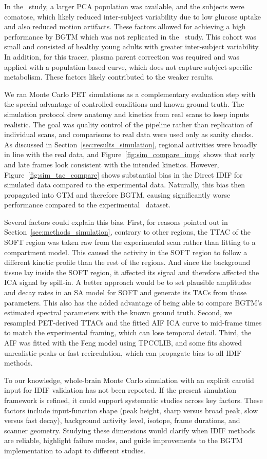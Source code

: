 In the \fdg\ study, a larger PCA population was available, and the subjects were comatose, which likely reduced inter-subject variability due to low glucose uptake and also reduced motion artifacts.
These factors allowed for achieving a high performance by BGTM which was not replicated in the \yohimbine\ study.
This cohort was small and consisted of healthy young adults with greater inter-subject variability.
In addition, for this tracer, plasma parent correction was required and was applied with a population-based curve, which does not capture subject-specific metabolism.
These factors likely contributed to the weaker results.

We ran Monte Carlo PET simulations as a complementary evaluation step with the special advantage of controlled conditions and known ground truth.
The simulation protocol drew anatomy and kinetics from real scans to keep inputs realistic.
The goal was quality control of the pipeline rather than replication of individual scans, and comparisons to real data were used only as sanity checks.
As discussed in Section~\ref{sec:results_simulation}, regional activities were broadly in line with the real data, and Figure~\ref{fig:sim_compare_imgs} shows that early and late frames look consistent with the intended kinetics.
However, Figure~\ref{fig:sim_tac_compare} shows substantial bias in the Direct IDIF for simulated data compared to the experimental data.
Naturally, this bias then propagated into GTM and therefore BGTM, causing significantly worse performance compared to the experimental \fdg\ dataset.

Several factors could explain this bias.
First, for reasons pointed out in Section~\ref{sec:methods_simulation}, contrary to other regions, the TTAC of the SOFT region was taken raw from the experimental scan rather than fitting to a compartment model.
This caused the activity in the SOFT region to follow a different kinetic profile than the rest of the regions.
And since the background tissue lay inside the SOFT region, it affected its signal and therefore affected the ICA signal by spill-in.
A better approach would be to set plausible amplitudes and decay rates in an SA model for SOFT and generate its TACs from those parameters.
This also has the added advantage of being able to compare BGTM’s estimated spectral parameters with the known ground truth.
Second, we resampled PET-derived TTACs and the fitted AIF ICA curve to mid-frame times to match the experimental framing, which can lose temporal detail.
Third, the AIF was fitted with the Feng model using TPCCLIB, and some fits showed unrealistic peaks or fast recirculation, which can propagate bias to all IDIF methods.

To our knowledge, whole-brain Monte Carlo simulation with an explicit carotid input for IDIF validation has not been reported.
If the present simulation framework is refined, it could support systematic studies across key factors.
These factors include input-function shape (peak height, sharp versus broad peak, slow versus fast decay), background activity level, isotope, frame durations, and scanner geometry.
Studying these dimensions would clarify when IDIF methods are reliable, highlight failure modes, and guide improvements to the BGTM implementation to adapt to different studies.

